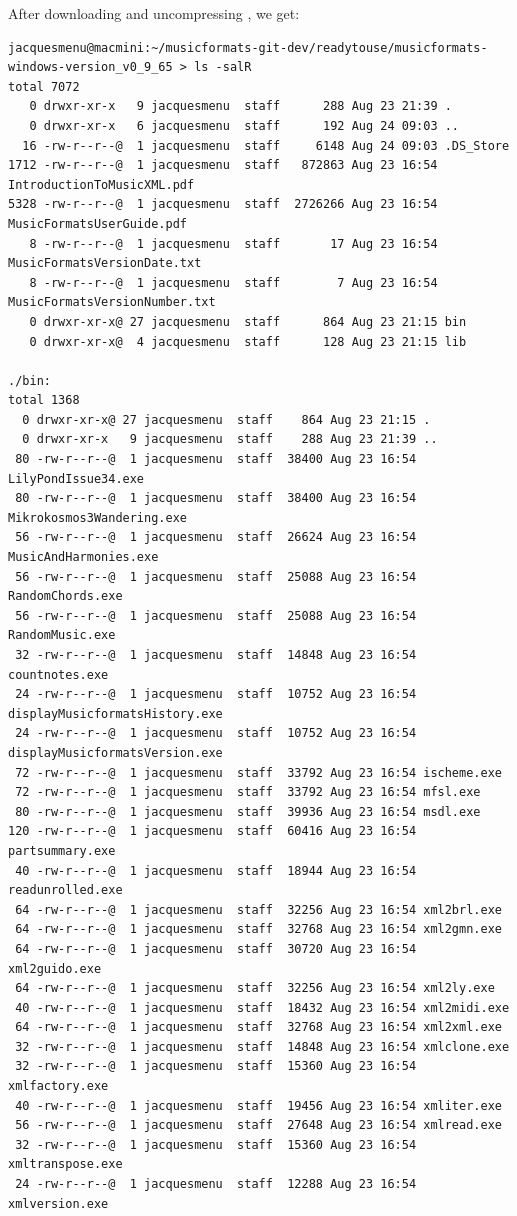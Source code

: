 After downloading and uncompressing , we get:
\begin{lstlisting}[language=Terminal]
jacquesmenu@macmini:~/musicformats-git-dev/readytouse/musicformats-windows-version_v0_9_65 > ls -salR
total 7072
   0 drwxr-xr-x   9 jacquesmenu  staff      288 Aug 23 21:39 .
   0 drwxr-xr-x   6 jacquesmenu  staff      192 Aug 24 09:03 ..
  16 -rw-r--r--@  1 jacquesmenu  staff     6148 Aug 24 09:03 .DS_Store
1712 -rw-r--r--@  1 jacquesmenu  staff   872863 Aug 23 16:54 IntroductionToMusicXML.pdf
5328 -rw-r--r--@  1 jacquesmenu  staff  2726266 Aug 23 16:54 MusicFormatsUserGuide.pdf
   8 -rw-r--r--@  1 jacquesmenu  staff       17 Aug 23 16:54 MusicFormatsVersionDate.txt
   8 -rw-r--r--@  1 jacquesmenu  staff        7 Aug 23 16:54 MusicFormatsVersionNumber.txt
   0 drwxr-xr-x@ 27 jacquesmenu  staff      864 Aug 23 21:15 bin
   0 drwxr-xr-x@  4 jacquesmenu  staff      128 Aug 23 21:15 lib

./bin:
total 1368
  0 drwxr-xr-x@ 27 jacquesmenu  staff    864 Aug 23 21:15 .
  0 drwxr-xr-x   9 jacquesmenu  staff    288 Aug 23 21:39 ..
 80 -rw-r--r--@  1 jacquesmenu  staff  38400 Aug 23 16:54 LilyPondIssue34.exe
 80 -rw-r--r--@  1 jacquesmenu  staff  38400 Aug 23 16:54 Mikrokosmos3Wandering.exe
 56 -rw-r--r--@  1 jacquesmenu  staff  26624 Aug 23 16:54 MusicAndHarmonies.exe
 56 -rw-r--r--@  1 jacquesmenu  staff  25088 Aug 23 16:54 RandomChords.exe
 56 -rw-r--r--@  1 jacquesmenu  staff  25088 Aug 23 16:54 RandomMusic.exe
 32 -rw-r--r--@  1 jacquesmenu  staff  14848 Aug 23 16:54 countnotes.exe
 24 -rw-r--r--@  1 jacquesmenu  staff  10752 Aug 23 16:54 displayMusicformatsHistory.exe
 24 -rw-r--r--@  1 jacquesmenu  staff  10752 Aug 23 16:54 displayMusicformatsVersion.exe
 72 -rw-r--r--@  1 jacquesmenu  staff  33792 Aug 23 16:54 ischeme.exe
 72 -rw-r--r--@  1 jacquesmenu  staff  33792 Aug 23 16:54 mfsl.exe
 80 -rw-r--r--@  1 jacquesmenu  staff  39936 Aug 23 16:54 msdl.exe
120 -rw-r--r--@  1 jacquesmenu  staff  60416 Aug 23 16:54 partsummary.exe
 40 -rw-r--r--@  1 jacquesmenu  staff  18944 Aug 23 16:54 readunrolled.exe
 64 -rw-r--r--@  1 jacquesmenu  staff  32256 Aug 23 16:54 xml2brl.exe
 64 -rw-r--r--@  1 jacquesmenu  staff  32768 Aug 23 16:54 xml2gmn.exe
 64 -rw-r--r--@  1 jacquesmenu  staff  30720 Aug 23 16:54 xml2guido.exe
 64 -rw-r--r--@  1 jacquesmenu  staff  32256 Aug 23 16:54 xml2ly.exe
 40 -rw-r--r--@  1 jacquesmenu  staff  18432 Aug 23 16:54 xml2midi.exe
 64 -rw-r--r--@  1 jacquesmenu  staff  32768 Aug 23 16:54 xml2xml.exe
 32 -rw-r--r--@  1 jacquesmenu  staff  14848 Aug 23 16:54 xmlclone.exe
 32 -rw-r--r--@  1 jacquesmenu  staff  15360 Aug 23 16:54 xmlfactory.exe
 40 -rw-r--r--@  1 jacquesmenu  staff  19456 Aug 23 16:54 xmliter.exe
 56 -rw-r--r--@  1 jacquesmenu  staff  27648 Aug 23 16:54 xmlread.exe
 32 -rw-r--r--@  1 jacquesmenu  staff  15360 Aug 23 16:54 xmltranspose.exe
 24 -rw-r--r--@  1 jacquesmenu  staff  12288 Aug 23 16:54 xmlversion.exe


\end{lstlisting}
